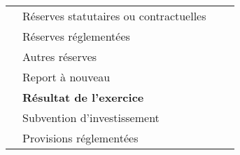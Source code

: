 \begin{table}[h]
\begin{tabular}{|l|p{6cm}|c|c|}
                                                                                              &  Réserves statutaires ou contractuelles                                                   &     &   \\ 
\cline{2-4}                                                                                                                                                           
                                                                                              &  Réserves réglementées                                               &     &   \\ 
\cline{2-4}                                                                                                                                                           
                                                                                              &  Autres réserves                                            &     &   \\ 
\cline{2-4}                                                                                                                                                           
                                                                                              &  Report à nouveau	                                     &     &   \\ 
\cline{2-4}                                                                                                                                                           
                                                                                              &  \textbf{Résultat de l'exercice}                                           &     &   \\ 
\cline{2-4}                                                                                                                                                           
                                                                                              &  Subvention d'investissement	                                           &     &   \\ 
\cline{2-4}                                                                                                                                                           
                                                                                              &  Provisions réglementées                                           &     &   \\ 
\cline{2-4}                                                                                     

\end{tabular}
\end{table}
